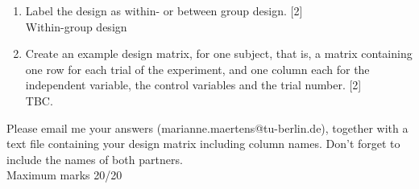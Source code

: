 \documentclass[12pt,english]{scrartcl}
\begin{document}
\begin{enumerate}
 \color{black}
 \item Label the design as within- or between group design. [2] \\
 \color{blue}
  Within-group design
 
 \color{black}
 \item Create an example design matrix, for one subject, that is, a matrix containing one row for each trial of the experiment, and one column each for the independent variable, the control variables and the trial number. [2] \\
 \color{blue}
 TBC.
 
 \end{enumerate}


Please email me your answers (marianne.maertens@tu-berlin.de), together with a text file containing your design matrix including column names. Don't forget to include the names of both partners. \\
Maximum marks 20/20
\end{document}
